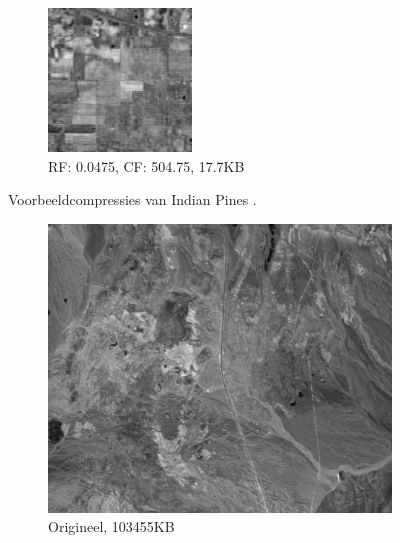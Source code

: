 \begin{figure}[]
\begin{subfigure}{0.48\textwidth}
  \centering
  \includegraphics[scale=1]{images/example_compression_Indian_Pines_0_05.png}
  \caption{RF: 0.0475, CF: 504.75, 17.7KB}
\end{subfigure}
\caption{Voorbeeldcompressies van Indian Pines \cite{ref:ehu_aviris}.}
\end{figure}

\begin{figure}[]
\centering
\begin{subfigure}{\textwidth}
  \centering
  \includegraphics[scale=0.55]{images/cuprite_cropped_sum.png}
  \caption{Origineel, 103455KB}
\end{subfigure}
\\
\begin{subfigure}{\textwidth}
  \centering

\end{subfigure}
\end{figure}
